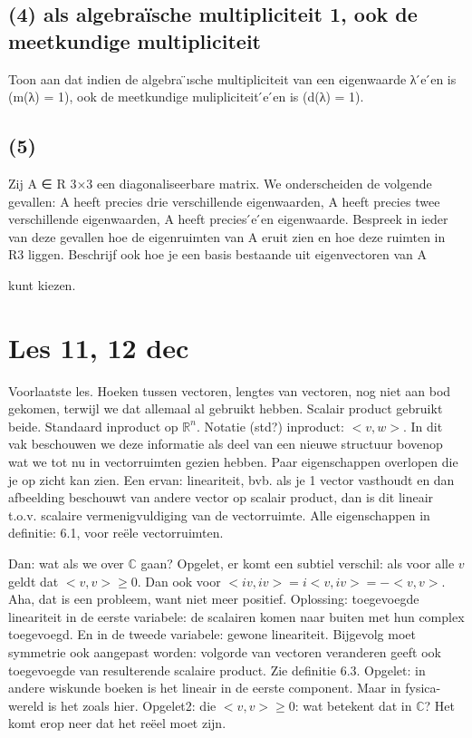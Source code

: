 \documentclass{article}
\begin{document}
\subsection*{(4) als algebra\"ische multipliciteit 1, ook de meetkundige multipliciteit}

Toon aan dat indien de algebra ̈ısche multipliciteit van een eigenwaarde λ  ́e ́en is (m(λ) = 1),
ook de meetkundige mulipliciteit  ́e ́en is (d(λ) = 1).

\subsection*{(5) }
Zij A ∈ R 3×3
een diagonaliseerbare matrix. We onderscheiden de volgende gevallen:
 A heeft precies drie verschillende eigenwaarden,
 A heeft precies twee verschillende eigenwaarden,
 A heeft precies  ́e ́en eigenwaarde.
Bespreek in ieder van deze gevallen hoe de eigenruimten van A eruit zien en hoe deze
ruimten in R3 liggen. 
Beschrijf ook hoe je een basis bestaande uit eigenvectoren van A

kunt kiezen.

\section*{Les 11, 12 dec}

Voorlaatste les. 
Hoeken tussen vectoren, lengtes van vectoren, nog niet aan bod gekomen, terwijl we dat allemaal al gebruikt hebben. Scalair product gebruikt beide. Standaard inproduct op $\mathbb{R}^n$. Notatie (std?) inproduct: $<v,w>$. In dit vak beschouwen we deze informatie als deel van een nieuwe structuur bovenop wat we tot nu in vectorruimten gezien hebben. 
Paar eigenschappen overlopen die je op zicht kan zien. Een ervan: lineariteit, bvb. als je 1 vector vasthoudt en dan afbeelding beschouwt van andere vector op scalair product, dan is dit lineair t.o.v. scalaire vermenigvuldiging van de vectorruimte. 
Alle eigenschappen in definitie: 6.1, voor re\"ele vectorruimten. 

Dan: wat als we over $\mathbb{C}$ gaan? Opgelet, er komt een subtiel verschil: als voor alle $v$ geldt dat $<v,v> \geq 0$. Dan ook voor $<iv, iv> = i<v,iv> = -<v,v>$. Aha, dat is een probleem, want niet meer positief. 
Oplossing: toegevoegde lineariteit in de eerste variabele: de scalairen komen naar buiten met hun complex toegevoegd. En in de tweede variabele: gewone lineariteit. Bijgevolg moet symmetrie ook aangepast worden: volgorde van vectoren veranderen geeft ook toegevoegde van resulterende scalaire product. 
Zie definitie 6.3. 
Opgelet: in andere wiskunde boeken is het lineair in de eerste component. Maar in fysica-wereld is het zoals hier. 
Opgelet2: die $<v,v> \geq 0$: wat betekent dat in $\mathbb{C}$? Het komt erop neer dat het re\"eel moet zijn. 
\end{document}
